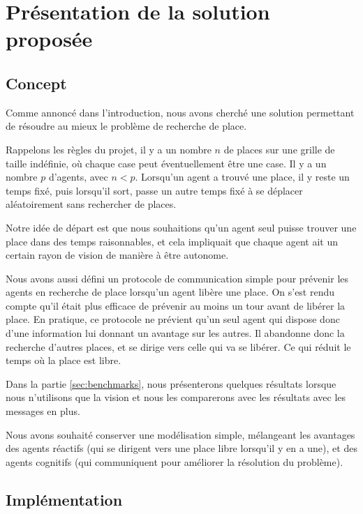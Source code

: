 \section{Présentation de la solution proposée}
\label{sec:presentation}

\subsection{Concept}
\label{sec:concept}

Comme annoncé dans l'introduction, nous avons cherché une solution
permettant de résoudre au mieux le problème de recherche de place.

Rappelons les règles du projet, il y a un nombre $n$ de places sur une
grille de taille indéfinie, où chaque case peut éventuellement être
une case. Il y a un nombre $p$ d'agents, avec $n < p$. Lorsqu'un agent
a trouvé une place, il y reste un temps fixé, puis lorsqu'il sort,
passe un autre temps fixé à se déplacer aléatoirement sans rechercher
de places.

Notre idée de départ est que nous souhaitions qu'un agent seul puisse
trouver une place dans des temps raisonnables, et cela impliquait que
chaque agent ait un certain rayon de vision de manière à être
autonome.

Nous avons aussi défini un protocole de communication simple pour
prévenir les agents en recherche de place lorsqu'un agent libère une
place. On s'est rendu compte qu'il était plus efficace de prévenir au
moins un tour avant de libérer la place. En pratique, ce protocole ne
prévient qu'un seul agent qui dispose donc d'une information lui
donnant un avantage sur les autres. Il abandonne donc la recherche
d'autres places, et se dirige vers celle qui va se libérer. Ce qui
réduit le temps où la place est libre.

Dans la partie \ref{sec:benchmarks}, nous présenterons quelques
résultats lorsque nous n'utilisons que la vision et nous les
comparerons avec les résultats avec les messages en plus.

Nous avons souhaité conserver une modélisation simple, mélangeant les
avantages des agents réactifs (qui se dirigent vers une place libre
lorsqu'il y en a une), et des agents cognitifs (qui communiquent pour
améliorer la résolution du problème).


\subsection{Implémentation}
\label{sec:implementation}

